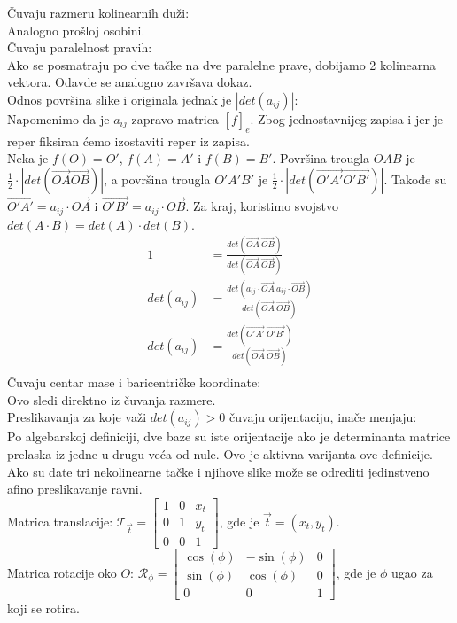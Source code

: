 \documentclass[12pt]{article}
\newcommand{\vek}[1]{\overrightarrow{#1}}
\begin{document}
Čuvaju razmeru kolinearnih duži:\\
Analogno prošloj osobini.\\
Čuvaju paralelnost pravih:\\
Ako se posmatraju po dve tačke na dve paralelne prave,
dobijamo 2 kolinearna vektora. Odavde se analogno završava dokaz.\\
Odnos površina slike i originala jednak je $|det(a_{ij})|$:\\
Napomenimo da je $a_{ij}$ zapravo matrica $[\overline{f}]_e$.
Zbog jednostavnijeg zapisa i jer je reper fiksiran ćemo izostaviti reper iz zapisa.\\
Neka je $f(O)=O'$, $f(A)=A'$ i $f(B)=B'$. Površina trougla
$OAB$ je $\frac{1}{2}\cdot |det(\vek{OA}\vek{OB})|$,
a površina trougla $O'A'B'$ je $\frac{1}{2}\cdot |det(\vek{O'A'}\vek{O'B'})|$.
Takođe su $\vek{O'A'}=a_{ij}\cdot \vek{OA}$ i $\vek{O'B'}=a_{ij}\cdot \vek{OB}$.
Za kraj, koristimo svojstvo $det(A\cdot B)=det(A)\cdot det(B)$.
\begin{align*}
    1           & =\frac{det(\vek{OA}\ \vek{OB})}{det(\vek{OA}\ \vek{OB})}                       \\
    det(a_{ij}) & =\frac{det(a_{ij}\cdot\vek{OA}\ a_{ij}\cdot\vek{OB})}{det(\vek{OA}\ \vek{OB})} \\
    det(a_{ij}) & =\frac{det(\vek{O'A'}\ \vek{O'B'})}{det(\vek{OA}\ \vek{OB})}                   \\
\end{align*}
Čuvaju centar mase i baricentričke koordinate:\\
Ovo sledi direktno iz čuvanja razmere.\\
Preslikavanja za koje važi $det(a_{ij})>0$ čuvaju orijentaciju,
inače menjaju:\\
Po algebarskoj definiciji, dve baze su iste orijentacije ako
je determinanta matrice prelaska iz jedne u drugu veća od
nule. Ovo je aktivna varijanta ove definicije.\\
Ako su date tri nekolinearne tačke i njihove slike
može se odrediti jedinstveno afino preslikavanje ravni.\\
Matrica translacije:
$\mathcal{T}_{\vek{t}}=\begin{bmatrix}
        1 & 0 & x_t \\
        0 & 1 & y_t \\
        0 & 0 & 1
    \end{bmatrix}$, gde je $\vek{t}=(x_t,y_t)$.\\
Matrica rotacije oko $O$:
$\mathcal{R}_\phi=\begin{bmatrix}
        \cos(\phi) & -\sin(\phi) & 0 \\
        \sin(\phi) & \cos(\phi)  & 0 \\
        0          & 0           & 1
    \end{bmatrix}$, gde je $\phi$ ugao za koji se rotira.\\
\end{document}
